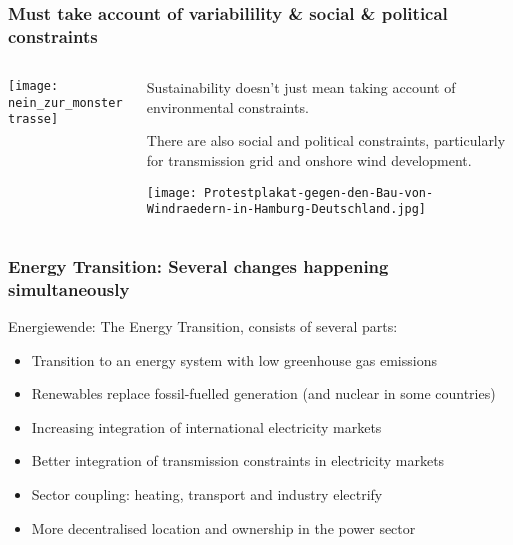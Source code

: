 \documentclass[10pt,aspectratio=169,dvipsnames]{beamer}
\let\olditem\item
\renewcommand{\item}{%
\olditem\vspace{5pt}}
\begin{document}
\begin{frame}[fragile]
  \frametitle{Must take account of variabilility \& social \& political constraints}



\begin{columns}[T]

  \begin{column}{5cm}


\centering
\texttt{[image: nein\_zur\_monstertrasse]}

  \end{column}


  \begin{column}{6.7cm}

    \vspace{.5cm}

    Sustainability doesn't just mean taking account of environmental constraints.

    \vspace{.5cm}

    There are also \alert{social and political constraints},
    particularly for transmission grid and onshore wind
    development.

    \vspace{.5cm}

\texttt{[image: Protestplakat-gegen-den-Bau-von-Windraedern-in-Hamburg-Deutschland.jpg]}

  \end{column}

\end{columns}

\end{frame}


\begin{frame}
  \frametitle{Energy Transition: Several changes happening simultaneously}

  \alert{Energiewende}: The Energy Transition, consists of several parts:

  \begin{itemize}
  \item Transition to an energy system with low greenhouse gas emissions
  \item Renewables replace fossil-fuelled generation (and nuclear in some countries)
  \item Increasing integration of international electricity markets
  \item Better integration of transmission constraints in electricity markets
  \item Sector coupling: heating, transport and industry electrify
  \item More decentralised location and ownership in the power sector
  \end{itemize}

\end{frame}
\end{document}
